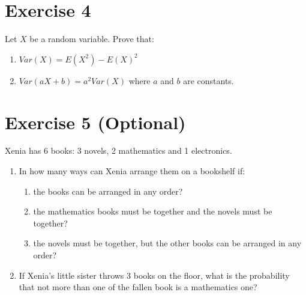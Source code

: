 \documentclass[12pt,thmsa]{article}\usepackage[]{graphicx}\usepackage[]{color}
\begin{document}
\section*{Exercise 4}

Let $X$ be a random variable. Prove that:
\begin{enumerate}
  \item $Var(X)=E(X^2)-E(X)^2$
  \item $Var(aX+b)=a^2 Var(X)$ where $a$ and $b$ are constants.
\end{enumerate}















\section*{Exercise 5 (Optional)}

Xenia has 6 books: 3 novels, 2 mathematics and 1 electronics.
\begin{enumerate}
  \item In how many ways can Xenia arrange them on a bookshelf if:
\begin{enumerate}
  \item the books can be arranged in any order?
  \item the mathematics books must be together and the novels must be together?
  \item the novels must be together, but the other books can be arranged in any order?
\end{enumerate}
  \item If Xenia's little sister throws 3 books on the floor, what is the probability that not more than one of the fallen book
  is a mathematics one?
\end{enumerate}
\end{document}
